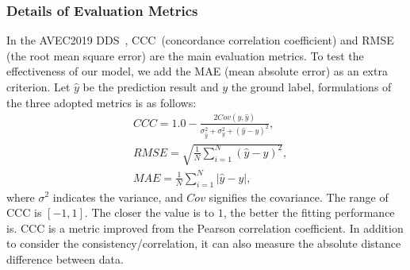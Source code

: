 \documentclass{article}
\begin{document}

\subsubsection{Details of Evaluation Metrics}
In the AVEC2019 DDS~\cite{AVEC2019}, CCC~(concordance correlation coefficient) and RMSE (the root mean square error) are the main evaluation metrics. To test the effectiveness of our model, we add the MAE (mean absolute error) as an extra criterion. Let $\hat{y}$ be the prediction result and $y$ the ground label, formulations of the three adopted metrics is as follows:
\begin{equation}
    \begin{split}
	& CCC = 1.0 - \frac{2Cov(y,\hat{y})}{\sigma^2_{\hat{y}} + \sigma^2_y + (\hat{y}-y)^2}, \\
	& RMSE = \sqrt{\frac{1}{N}\sum_{i=1}^N(\hat{y}-y)^2}, \\
    & MAE = \frac{1}{N} \sum_{i=1}^N |\hat{y}-y|,
	\end{split}
\end{equation}
where $\sigma^2$ indicates the variance, and $Cov$ signifies the covariance. The range of CCC is $[-1,1]$. The closer the value is to $1$, the better the fitting performance is. CCC is a metric improved from the Pearson correlation coefficient. In addition to consider the consistency/correlation, it can also measure the absolute distance difference between data.
\end{document}
